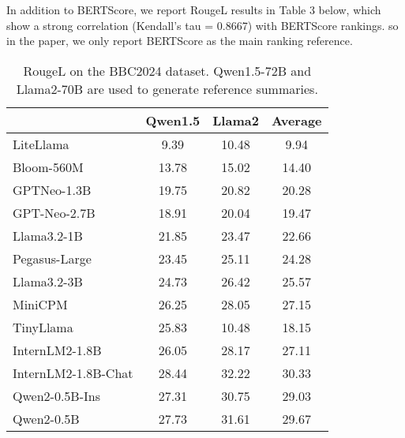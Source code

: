 \documentclass[a4paper]{article}
\begin{document}
{In addition to BERTScore, we report RougeL results in Table 3 below, which show a strong correlation (Kendall’s tau = 0.8667) with BERTScore rankings. so in the paper, we only report BERTScore as the main ranking reference.}



\begin{table}[h]
\centering 
\caption{RougeL on the BBC2024 dataset. Qwen1.5-72B and Llama2-70B are used to generate reference summaries.}
\begin{tabular}{lccc}
\hline
\multicolumn{1}{l}{} & \multicolumn{1}{l}{Qwen1.5} & \multicolumn{1}{l}{Llama2} & \multicolumn{1}{l}{Average} \\ \hline
LiteLlama            & 9.39                        & 10.48                      & 9.94                        \\
Bloom-560M           & 13.78                       & 15.02                      & 14.40                       \\
GPTNeo-1.3B          & 19.75                       & 20.82                      & 20.28                       \\
GPT-Neo-2.7B         & 18.91                       & 20.04                      & 19.47                       \\
Llama3.2-1B          & 21.85                       & 23.47                      & 22.66                       \\
Pegasus-Large        & 23.45                       & 25.11                      & 24.28                       \\
Llama3.2-3B          & 24.73                       & 26.42                      & 25.57                       \\
MiniCPM              & 26.25                       & 28.05                      & 27.15                       \\
TinyLlama            & 25.83                       & 10.48                      & 18.15                       \\
InternLM2-1.8B       & 26.05                       & 28.17                      & 27.11                       \\
InternLM2-1.8B-Chat  & 28.44                       & 32.22                      & 30.33                       \\
Qwen2-0.5B-Ins       & 27.31                       & 30.75                      & 29.03                       \\
Qwen2-0.5B           & 27.73                       & 31.61                      & 29.67                       \\

\end{tabular}
\end{table}
\end{document}
